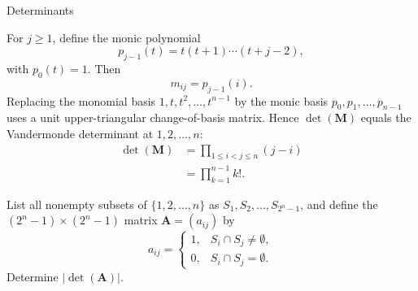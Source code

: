 \begin{expectedproblemgroup}{Determinants}
        \begin{expectedsubsolution}
            For $j\geq1$, define the monic polynomial
            \[
                p_{j-1}(t)=t(t+1)\cdots(t+j-2),
            \]
            with $p_0(t)=1$. Then
            \[
                m_{ij}=p_{j-1}(i).
            \]
            Replacing the monomial basis
            $1,t,t^2,\ldots,t^{n-1}$ by the monic basis
            $p_0,p_1,\ldots,p_{n-1}$ uses a unit upper-triangular change-of-basis
            matrix. Hence $\det(\mathbf{M})$ equals the Vandermonde determinant at
            $1,2,\ldots,n$:
            \[
                \begin{aligned}
                    \det(\mathbf{M})
                    &=
                    \prod_{1\leq i<j\leq n}(j-i)\\
                    &=
                    \boxed{\prod_{k=1}^{n-1}k!}.
                \end{aligned}
            \]
        \end{expectedsubsolution}

        \begin{expectedsubproblem}
            List all nonempty subsets of $\{1,2,\ldots,n\}$ as
            $S_1,S_2,\ldots,S_{2^n-1}$, and define the
            $(2^n-1)\times(2^n-1)$ matrix $\mathbf{A}=(a_{ij})$ by
            \[
                a_{ij}
                =
                \begin{cases}
                    1, & S_i\cap S_j\neq\emptyset,\\
                    0, & S_i\cap S_j=\emptyset.
                \end{cases}
            \]
            Determine $|\det(\mathbf{A})|$.
        \end{expectedsubproblem}


\end{expectedproblemgroup}
